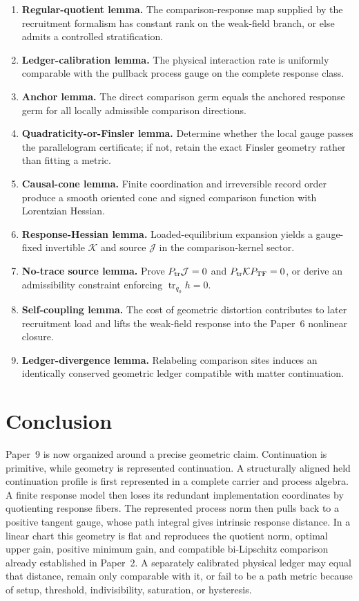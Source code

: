 \documentclass[11pt]{article}
\theoremstyle{remark}
\newcommand{\Ptr}{P_{\rm tr}}
\newcommand{\Ptf}{P_{\rm TF}}
\begin{document}
\begin{enumerate}
\item \textbf{Regular-quotient lemma.}  The comparison-response map supplied by the recruitment formalism has constant rank on the weak-field branch, or else admits a controlled stratification.
\item \textbf{Ledger-calibration lemma.}  The physical interaction rate is uniformly comparable with the pullback process gauge on the complete response class.
\item \textbf{Anchor lemma.}  The direct comparison germ equals the anchored response germ for all locally admissible comparison directions.
\item \textbf{Quadraticity-or-Finsler lemma.}  Determine whether the local gauge passes the parallelogram certificate; if not, retain the exact Finsler geometry rather than fitting a metric.
\item \textbf{Causal-cone lemma.}  Finite coordination and irreversible record order produce a smooth oriented cone and signed comparison function with Lorentzian Hessian.
\item \textbf{Response-Hessian lemma.}  Loaded-equilibrium expansion yields a gauge-fixed invertible $\mathcal K$ and source $\mathcal J$ in the comparison-kernel sector.
\item \textbf{No-trace source lemma.}  Prove $\Ptr\mathcal J=0$ and $\Ptr\mathcal K\Ptf=0$, or derive an admissibility constraint enforcing $\operatorname{tr}_{q_0}h=0$.
\item \textbf{Self-coupling lemma.}  The cost of geometric distortion contributes to later recruitment load and lifts the weak-field response into the Paper~6 nonlinear closure.
\item \textbf{Ledger-divergence lemma.}  Relabeling comparison sites induces an identically conserved geometric ledger compatible with matter continuation.
\end{enumerate}

\section{Conclusion}

Paper~9 is now organized around a precise geometric claim.  Continuation is primitive, while geometry is represented continuation.  A structurally aligned held continuation profile is first represented in a complete carrier and process algebra.  A finite response model then loses its redundant implementation coordinates by quotienting response fibers.  The represented process norm then pulls back to a positive tangent gauge, whose path integral gives intrinsic response distance.  In a linear chart this geometry is flat and reproduces the quotient norm, optimal upper gain, positive minimum gain, and compatible bi-Lipschitz comparison already established in Paper~2.  A separately calibrated physical ledger may equal that distance, remain only comparable with it, or fail to be a path metric because of setup, threshold, indivisibility, saturation, or hysteresis.
\end{document}
